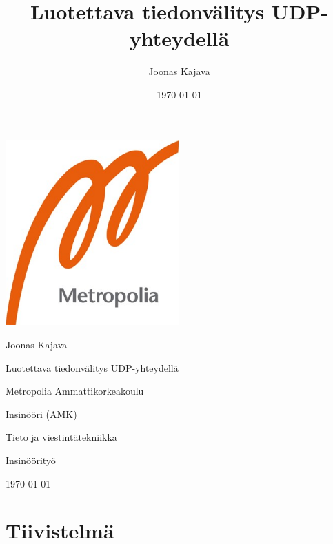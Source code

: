 \documentclass[a4paper,12pt]{article}
\title{Luotettava tiedonvälitys UDP-yhteydellä}
\author{Joonas Kajava}
\date{\today}
\newcommand{\me}{Joonas Kajava}
\renewcommand{\title}{Luotettava tiedonvälitys UDP-yhteydellä}
\begin{document}
    \begin{titlepage}
    
        \pagestyle{empty}
        
        \includegraphics[width=0.5\textwidth]{images/metropolia}\par\vspace{2cm}
        {\Large \me}\par \vspace{1cm}

        {\Huge \textcolor{title}{\title}}\par \vspace{1cm}

        \vfill

        Metropolia Ammattikorkeakoulu\par
        Insinööri (AMK)\par
        Tieto ja viestintätekniikka\par
        Insinöörityö\par
        \today

        \newpage



        \section*{Tiivistelmä}


\end{titlepage}
\end{document}
